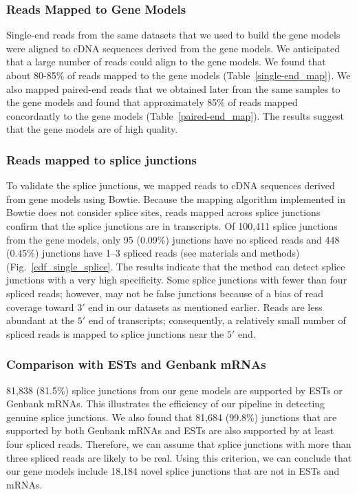 \documentclass[10pt]{article}
\begin{document}
\subsubsection*{Reads Mapped to Gene Models}

Single-end reads from the same datasets that we used to build the gene models were aligned to cDNA sequences derived from the gene models.
We anticipated that a large number of reads could align to the gene models.
We found that about 80-85\% of reads mapped to the gene models (Table~\ref{single-end_map}).
We also mapped paired-end reads that we obtained later from the same samples to
the gene models and found that approximately 85\% of reads mapped concordantly to the gene models (Table~\ref{paired-end_map}).
The results suggest that the gene models are of high quality.

\subsubsection*{Reads mapped to splice junctions}
To validate the splice junctions, we mapped reads to cDNA sequences derived from gene models using Bowtie\cite{Langmead:2009fv}.
Because the mapping algorithm implemented in Bowtie does not consider splice sites, reads mapped across splice junctions
confirm that the splice junctions are in transcripts.
Of 100,411 splice junctions from the gene models, only 95 (0.09\%) junctions have no spliced reads and 448 (0.45\%)
junctions have 1--3 spliced reads (see materials and methods) (Fig.~\ref{cdf_single_splice}.
The results indicate that the method can detect splice junctions with a very high specificity.
Some splice junctions with fewer than four spliced reads; however, may not be false junctions because of a bias of
read coverage toward $3'$ end in our datasets as mentioned earlier.
Reads are less abundant at the $5'$ end of transcripts; consequently, a relatively small number of spliced reads is mapped
to splice junctions near the $5'$ end.

\subsubsection*{Comparison with ESTs and Genbank mRNAs}
81,838 (81.5\%) splice junctions from our gene models are supported by ESTs or Genbank mRNAs.
This illustrates the efficiency of our pipeline in detecting genuine splice junctions.
We also found that 81,684 (99.8\%) junctions that are supported by both Genbank mRNAs and ESTs are also supported by at least four spliced reads.
Therefore, we can assume that splice junctions with more than three spliced reads are likely to be real.
Using this criterion, we can conclude that our gene models include 18,184 novel splice junctions that are not in ESTs and mRNAs.
\end{document}
